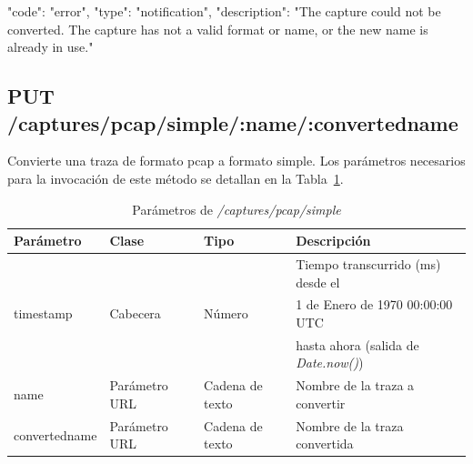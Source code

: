 \begin{itemize}
{\begin{minipage}{\textwidth}
\begin{code}[language=json]
{
  "code": "error",
  "type": "notification",
  "description": "The capture could not be converted. The capture has not a valid format or name, or the new name is already in use."
}
\end{code}
\end{minipage}
}
\end{itemize}

%
%
\subsection{PUT /captures/pcap/simple/:name/:convertedname}
Convierte una \gls{traza} de formato \gls{pcap} a formato \gls{simple}.
Los parámetros necesarios para la invocación de este método se detallan en la Tabla~\ref{extra:api:capturespcapsimple:invocacion}.

\begin{table}[H]
\centering
\begin{tabular}{|l|l|l|l|}
\hline
\rowcolor[HTML]{F5F5F5}
\textbf{Parámetro}  & \textbf{Clase} & \textbf{Tipo}   & \textbf{Descripción}                        \\ \hline
                    &                &                 & Tiempo transcurrido (ms) desde el           \\
timestamp           & Cabecera       & Número          & 1 de Enero de 1970 00:00:00 UTC             \\
                    &                &                 & hasta ahora (salida de \textit{Date.now()}) \\ \hline
name                & Parámetro URL  & Cadena de texto & Nombre de la \gls{traza} a convertir        \\ \hline
convertedname       & Parámetro URL  & Cadena de texto & Nombre de la \gls{traza} convertida         \\ \hline
\end{tabular}
\caption{Parámetros de \textit{/captures/pcap/simple}}
\label{extra:api:capturespcapsimple:invocacion}
\end{table}


